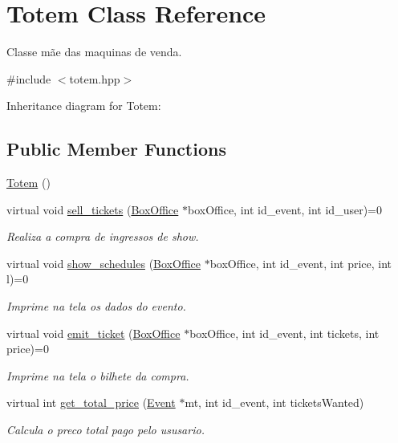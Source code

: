\hypertarget{class_totem}{}\section{Totem Class Reference}
\label{class_totem}


Classe mãe das maquinas de venda.  




{\ttfamily \#include $<$totem.\+hpp$>$}



Inheritance diagram for Totem\+:
\subsection*{Public Member Functions}
\begin{DoxyCompactItemize}
\item 
\hyperlink{class_totem_a21614625adf52c03a7281f2738771495}{Totem} ()
\item 
virtual void \hyperlink{class_totem_ad0c0e1a8e9441601d7899184e368ce2b}{sell\+\_\+tickets} (\hyperlink{class_box_office}{Box\+Office} $\ast$box\+Office, int id\+\_\+event, int id\+\_\+user)=0
\begin{DoxyCompactList}\small\item\em Realiza a compra de ingressos de show. \end{DoxyCompactList}\item 
virtual void \hyperlink{class_totem_a458d7bf060d703d7306aa4cc9d19e63c}{show\+\_\+schedules} (\hyperlink{class_box_office}{Box\+Office} $\ast$box\+Office, int id\+\_\+event, int price, int l)=0
\begin{DoxyCompactList}\small\item\em Imprime na tela os dados do evento. \end{DoxyCompactList}\item 
virtual void \hyperlink{class_totem_af7ae700ac13703c0a7381cfe663f0ac7}{emit\+\_\+ticket} (\hyperlink{class_box_office}{Box\+Office} $\ast$box\+Office, int id\+\_\+event, int tickets, int price)=0
\begin{DoxyCompactList}\small\item\em Imprime na tela o bilhete da compra. \end{DoxyCompactList}\item 
virtual int \hyperlink{class_totem_a72f671d4db9c034526fa6d69e2df9812}{get\+\_\+total\+\_\+price} (\hyperlink{class_event}{Event} $\ast$mt, int id\+\_\+event, int tickets\+Wanted)
\begin{DoxyCompactList}\small\item\em Calcula o preco total pago pelo ususario. \end{DoxyCompactList}\item 

\end{DoxyCompactItemize}
